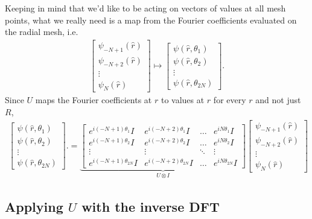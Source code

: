 Keeping in mind that we'd like to be acting on vectors of values at
all mesh points, what we really need is a map from the Fourier coefficients
evaluated on the radial mesh, i.e.
\begin{align*}
 \begin{bmatrix}
  \psi_{-N+1}(\hat{r}) \\ \psi_{-N+2}(\hat{r}) \\ \vdots \\ \psi_N(\hat{r})
 \end{bmatrix}
 \mapsto
 \begin{bmatrix}
  \psi(\hat{r},\theta_1) \\ \psi(\hat{r},\theta_2) \\ \vdots \\ 
  \psi(\hat{r},\theta_{2N})
 \end{bmatrix}.
\end{align*}
Since $U$ maps the Fourier coefficients at $r$ to values at $r$ for 
every $r$ and not just $R$, 
\begin{align*}
 \begin{bmatrix}
  \psi(\hat{r},\theta_1) \\ \psi(\hat{r},\theta_2) \\ \vdots \\ 
  \psi(\hat{r},\theta_{2N})
 \end{bmatrix}.
 = 
 \underbrace{
 \begin{bmatrix}
  e^{i(-N+1)\theta_1}I    & e^{i(-N+2)\theta_1}I    & \hdots & e^{iN\theta_1}I \\
  e^{i(-N+1)\theta_2}I    & e^{i(-N+2)\theta_2}I    & \hdots & e^{iN\theta_2}I \\ 
        \vdots            & \vdots                  & \ddots &      \vdots     \\
  e^{i(-N+1)\theta_{2N}}I & e^{i(-N+2)\theta_{2N}}I & \hdots & e^{iN\theta_{2N}}I
 \end{bmatrix}
 }_{U \otimes I}
 \begin{bmatrix}
  \psi_{-N+1}(\hat{r}) \\ \psi_{-N+2}(\hat{r}) \\ \vdots \\ \psi_N(\hat{r})
 \end{bmatrix}
\end{align*}


\subsection{Applying $U$ with the inverse DFT}

